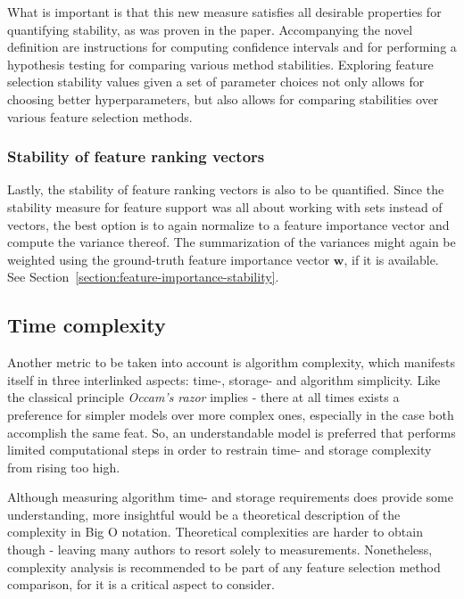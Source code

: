 \documentclass[../main.tex]{subfiles}
\begin{document}
What is important is that this new measure satisfies all desirable properties for quantifying stability, as was proven in the paper. Accompanying the novel definition are instructions for computing confidence intervals and for performing a hypothesis testing for comparing various method stabilities. Exploring feature selection stability values given a set of parameter choices not only allows for choosing better hyperparameters, but also allows for comparing stabilities over various feature selection methods.


\subsubsection{Stability of feature ranking vectors}
Lastly, the stability of feature ranking vectors is also to be quantified. Since the stability measure for feature support was all about working with sets instead of vectors, the best option is to again normalize to a feature importance vector and compute the variance thereof. The summarization of the variances might again be weighted using the ground-truth feature importance vector $\boldsymbol{w}$, if it is available. See Section~\ref{section:feature-importance-stability}.





\subsection{Time complexity}
Another metric to be taken into account is algorithm complexity, which manifests itself in three interlinked aspects: time-, storage- and algorithm simplicity. Like the classical principle \textit{Occam's razor} implies - there at all times exists a preference for simpler models over more complex ones, especially in the case both accomplish the same feat. So, an understandable model is preferred that performs limited computational steps in order to restrain time- and storage complexity from rising too high.

Although measuring algorithm time- and storage requirements does provide some understanding, more insightful would be a theoretical description of the complexity in Big O notation. Theoretical complexities are harder to obtain though - leaving many authors to resort solely to measurements. Nonetheless, complexity analysis is recommended to be part of any feature selection method comparison, for it is a critical aspect to consider.
\end{document}
